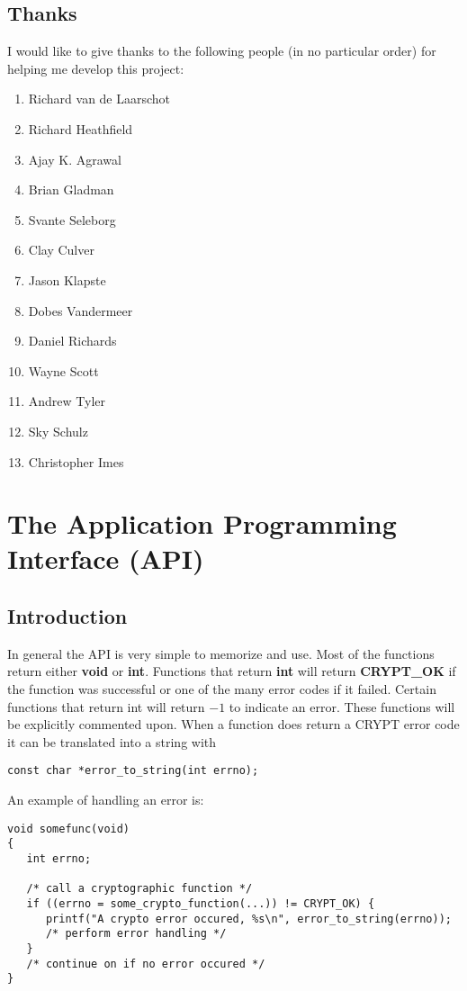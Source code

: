 \documentclass[b5paper]{book}
\begin{document}
\section{Thanks}
I would like to give thanks to the following people (in no particular order) for helping me develop this project:
\begin{enumerate}
   \item Richard van de Laarschot
   \item Richard Heathfield
   \item Ajay K. Agrawal
   \item Brian Gladman
   \item Svante Seleborg
   \item Clay Culver
   \item Jason Klapste
   \item Dobes Vandermeer
   \item Daniel Richards
   \item Wayne Scott
   \item Andrew Tyler
   \item Sky Schulz
   \item Christopher Imes
\end{enumerate}

\chapter{The Application Programming Interface (API)}
\section{Introduction}
 

In general the API is very simple to memorize and use.  Most of the functions return either {\bf void} or {\bf int}.  Functions
that return {\bf int} will return {\bf CRYPT\_OK} if the function was successful or one of the many error codes 
if it failed.  Certain functions that return int will return $-1$ to indicate an error.  These functions will be explicitly
commented upon.  When a function does return a CRYPT error code it can be translated into a string with

\begin{verbatim}
const char *error_to_string(int errno);
\end{verbatim}

An example of handling an error is:
\begin{verbatim}
void somefunc(void)
{
   int errno;
   
   /* call a cryptographic function */
   if ((errno = some_crypto_function(...)) != CRYPT_OK) {
      printf("A crypto error occured, %s\n", error_to_string(errno));
      /* perform error handling */
   }
   /* continue on if no error occured */
}
\end{verbatim}
\end{document}
